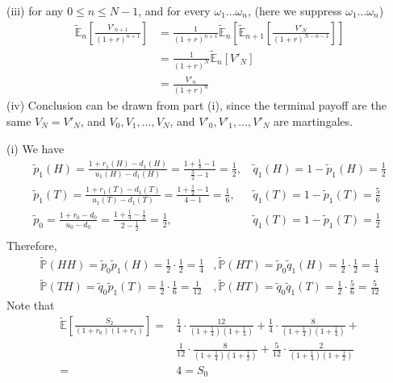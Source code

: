\documentclass[12pt]{article}
\newenvironment{problem}[2][Problem]{\begin{trivlist}
		\item[\hskip \labelsep {\bfseries #1}\hskip \labelsep {\bfseries #2.}]}{\end{trivlist}}
\begin{document}
	(iii) for any $0\le n\le N-1$, and for every $\omega_1...\omega_n$, (here we suppress $\omega_1...\omega_n$)
	\begin{align*}
	\tilde{\mathbb{E}}_n\left[\frac{V'_{n+1}}{(1+r)^{n+1}}\right] &= \frac{1}{(1+r)^{n+1}}\tilde{\mathbb{E}}_n\left[\tilde{\mathbb{E}}_{n+1}\left[\frac{V'_N}{(1+r)^{N-n-1}}\right]\right]\\
	&=\frac{1}{(1+r)^{N}}\tilde{\mathbb{E}}_n\left[V'_N\right]\\
	&=\frac{V'_n}{(1+r)^n}
	\end{align*}
	(iv) Conclusion can be drawn from part (i), since the terminal payoff are the same $V_N = V'_N$, and $V_0,V_1,...,V_N$, and $V'_0,V'_1,...,V'_N$ are martingales. 
	\begin{problem}{9}\end{problem}
	(i) We have
	\begin{align*}\tilde{p}_1(H) = \frac{1+r_1(H)-d_1(H)}{u_1(H)-d_1(H)} = \frac{1+\frac{1}{4}-1}{\frac{3}{2}-1} =\frac{1}{2},&\,\tilde{q}_1(H)=1-\tilde{p}_1(H) = \frac{1}{2}\\
	\tilde{p}_1(T) = \frac{1+r_1(T)-d_1(T)}{u_1(T)-d_1(T)} = \frac{1+\frac{1}{2}-1}{4-1} =\frac{1}{6},&\,\tilde{q}_1(T)=1-\tilde{p}_1(T) = \frac{5}{6}\\
	\tilde{p}_0 = \frac{1+r_0-d_0}{u_0-d_0} = \frac{1+\frac{1}{4}-\frac{1}{2}}{2-\frac{1}{2}} =\frac{1}{2},&\,\tilde{q}_1(T)=1-\tilde{p}_1(T) = \frac{1}{2}\\ \end{align*}
	Therefore, 
	\begin{align*}
	\tilde{\mathbb{P}}(HH)=\tilde{p}_0\tilde{p}_1(H) = \frac{1}{2}\cdot\frac{1}{2} = \frac{1}{4} &, \tilde{\mathbb{P}}(HT)=\tilde{p}_0\tilde{q}_1(H) = \frac{1}{2}\cdot\frac{1}{2} = \frac{1}{4}\\
	\tilde{\mathbb{P}}(TH)=\tilde{q}_0\tilde{p}_1(T) = \frac{1}{2}\cdot\frac{1}{6} = \frac{1}{12} &, \tilde{\mathbb{P}}(HT)=\tilde{q}_0\tilde{q}_1(T) = \frac{1}{2}\cdot\frac{5}{6} = \frac{5}{12}
	\end{align*}
	Note that 
	\begin{align*}
	\tilde{\mathbb{E}}\left[\frac{S_2}{(1+r_0)(1+r_1)}\right] = & \frac{1}{4}\cdot\frac{12}{(1+\frac{1}{4})(1+\frac{1}{4})} + \frac{1}{4}\cdot\frac{8}{(1+\frac{1}{4})(1+\frac{1}{4})} +\\ &\frac{1}{12}\cdot\frac{8}{(1+\frac{1}{4})(1+\frac{1}{2})} + \frac{5}{12}\cdot\frac{2}{(1+\frac{1}{4})(1+\frac{1}{2})}\\
	=&4 = S_0
	\end{align*}
\end{document}
